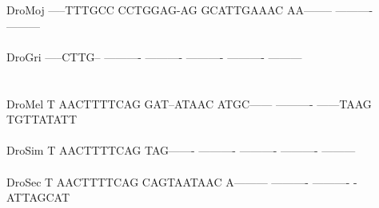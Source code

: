 \documentclass[11pt,twoside,reqno,a4paper]{article}
\begin{document}
{DroMoj	-----TTTGCC	CCTGGAG-AG	GCATTGAAAC	AA--------	----------	---------\\
\hspace*{7\charwidth}\hspace*{1\charwidth}\hspace*{1\charwidth}\hspace*{1\charwidth}\hspace*{1\charwidth}\hspace*{1\charwidth}\\
DroGri	-----CTTG--	----------	----------	----------	----------	---------\\
\hspace*{7\charwidth}\hspace*{1\charwidth}\hspace*{1\charwidth}\hspace*{1\charwidth}\hspace*{1\charwidth}\hspace*{1\charwidth}\\
\\
DroMel	T	AACTTTTCAG	GAT--ATAAC	ATGC------	----------	------TAAG	TGTTATATT\\
\hspace*{7\charwidth}\hspace*{1\charwidth}\hspace*{1\charwidth}\hspace*{1\charwidth}\hspace*{1\charwidth}\hspace*{1\charwidth}\hspace*{1\charwidth}\\
DroSim	T	AACTTTTCAG	TAG-------	----------	----------	----------	---------\\
\hspace*{7\charwidth}\hspace*{1\charwidth}\hspace*{1\charwidth}\hspace*{1\charwidth}\hspace*{1\charwidth}\hspace*{1\charwidth}\hspace*{1\charwidth}\\
DroSec	T	AACTTTTCAG	CAGTAATAAC	A---------	----------	----------	-ATTAGCAT\\
\hspace*{7\charwidth}\hspace*{1\charwidth}\hspace*{1\charwidth}\hspace*{1\charwidth}\hspace*{1\charwidth}\hspace*{1\charwidth}\hspace*{1\charwidth}\\
}
\end{document}
